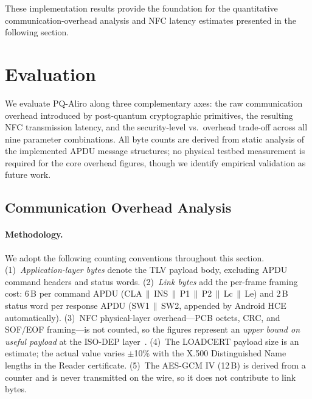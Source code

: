 \documentclass[runningheads]{llncs}
\begin{document}
These implementation results provide the foundation for the quantitative communication-overhead analysis and NFC latency estimates presented in the following section.

\section{Evaluation}
\label{sec:evaluation}

We evaluate PQ-Aliro along three complementary axes: the raw communication
overhead introduced by post-quantum cryptographic primitives, the resulting
NFC transmission latency, and the security-level vs.\ overhead trade-off
across all nine parameter combinations.  All byte counts are derived from
static analysis of the implemented APDU message structures; no physical
testbed measurement is required for the core overhead figures, though we
identify empirical validation as future work.

\subsection{Communication Overhead Analysis}
\label{sec:eval:overhead}

\paragraph{Methodology.}
We adopt the following counting conventions throughout this section.
(1)~\emph{Application-layer bytes} denote the TLV payload body, excluding
APDU command headers and status words.
(2)~\emph{Link bytes} add the per-frame framing cost: 6\,B per command
APDU (CLA\,$\|$\,INS\,$\|$\,P1\,$\|$\,P2\,$\|$\,Lc\,$\|$\,Le) and 2\,B
status word per response APDU (SW1\,$\|$\,SW2, appended by Android HCE
automatically).
(3)~NFC physical-layer overhead—PCB octets, CRC, and SOF/EOF framing—is
not counted, so the figures represent an \emph{upper bound on useful
payload} at the ISO-DEP layer~\cite{CSA:Aliro10}.
(4)~The LOADCERT payload size is an estimate; the actual value varies
$\pm$10\% with the X.500 Distinguished Name lengths in the Reader
certificate.
(5)~The AES-GCM IV (12\,B) is derived from a counter and is never
transmitted on the wire, so it does not contribute to link bytes.
\end{document}
